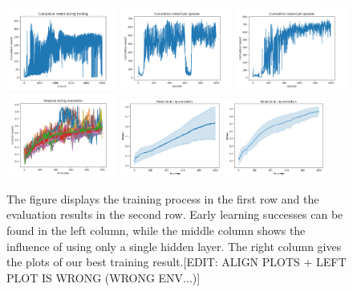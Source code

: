 \begin{figure}
	\includegraphics[width=0.325\textwidth]{plots/ddpg_ball_first_train.png}
	\includegraphics[width=0.325\textwidth]{plots/ddpg_ball_1layer_train.png}
	\includegraphics[width=0.325\textwidth]{plots/ddpg_ball_best_train.png}
	\includegraphics[width=0.325\textwidth]{plots/ddpg_ball_first_eval.png}
	\includegraphics[width=0.295\textwidth]{plots/DDPGballbalancer24-2-16.png}
	\includegraphics[width=0.295\textwidth]{plots/DDPGballbalancer26-2-20.png}

	\caption{The figure displays the training process in the first row and the evaluation results in the second row. Early learning successes can be found in the left column, while the middle column shows the influence of using only a single hidden layer. The right column gives the plots of our best training result.[EDIT: ALIGN PLOTS + LEFT PLOT IS WRONG (WRONG ENV...)]}
	\label{ddpg:ball}
\end{figure}

